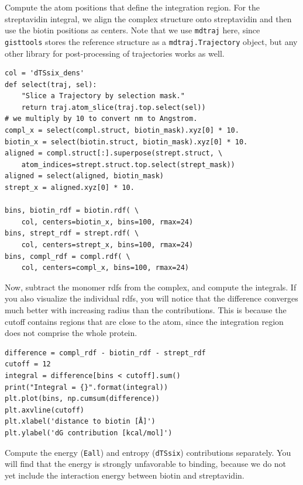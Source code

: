 \documentclass[9pt,tutorial]{livecoms}
\newcommand{\software}{\texttt}
\newcommand{\todo}{\textcolor{red}}
\newcommand\inlinecode{\texttt}
\begin{document}
Compute the atom positions that define the integration region.
For the streptavidin integral, we align the complex structure onto streptavidin and then use the biotin positions as centers.
Note that we use \software{mdtraj} here, since \software{gisttools} stores the reference structure as a \inlinecode{mdtraj.Trajectory} object, but any other library for post-processing of trajectories works as well.
\begin{lstlisting}[style=python]
col = 'dTSsix_dens'
def select(traj, sel):
    "Slice a Trajectory by selection mask."
    return traj.atom_slice(traj.top.select(sel))
# we multiply by 10 to convert nm to Angstrom.
compl_x = select(compl.struct, biotin_mask).xyz[0] * 10.
biotin_x = select(biotin.struct, biotin_mask).xyz[0] * 10.
aligned = compl.struct[:].superpose(strept.struct, \
    atom_indices=strept.struct.top.select(strept_mask))
aligned = select(aligned, biotin_mask)
strept_x = aligned.xyz[0] * 10.

bins, biotin_rdf = biotin.rdf( \
    col, centers=biotin_x, bins=100, rmax=24)
bins, strept_rdf = strept.rdf( \
    col, centers=strept_x, bins=100, rmax=24)
bins, compl_rdf = compl.rdf( \
    col, centers=compl_x, bins=100, rmax=24)
\end{lstlisting}

Now, subtract the monomer rdfs from the complex, and compute the integrals.
If you also visualize the individual rdfs, you will notice that the difference converges much better with increasing radius than the contributions.
This is because the cutoff contains regions that are close to the atom, since the integration region does not comprise the whole protein.

\begin{lstlisting}[style=python]
difference = compl_rdf - biotin_rdf - strept_rdf
cutoff = 12
integral = difference[bins < cutoff].sum()
print("Integral = {}".format(integral))
plt.plot(bins, np.cumsum(difference))
plt.axvline(cutoff)
plt.xlabel('distance to biotin [Å]')
plt.ylabel('dG contribution [kcal/mol]')
\end{lstlisting}
Compute the energy (\inlinecode{Eall}) and entropy (\inlinecode{dTSsix}) contributions separately.
You will find that the energy is strongly unfavorable to binding, because we do not yet include the interaction energy between biotin and streptavidin.
\end{document}
